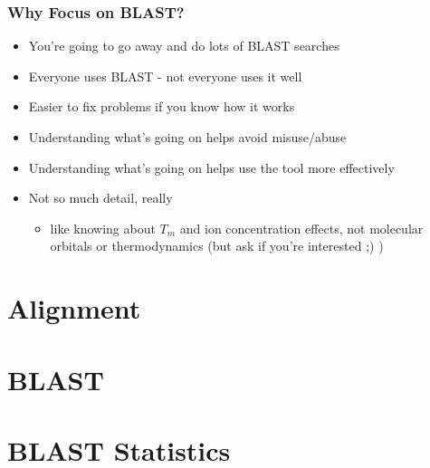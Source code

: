 \begin{frame}
  \frametitle{Why Focus on BLAST?}
  \begin{itemize}
    \item You're going to go away and do lots of BLAST searches
    \item Everyone uses BLAST - not everyone uses it well
    \item Easier to fix problems if you know how it works
    \item Understanding what's going on helps avoid misuse/abuse
    \item Understanding what's going on helps use the tool more effectively
    \item Not so much detail, really
    \begin{itemize}
      \item like knowing about $T_m$ and ion concentration effects, not molecular 
               orbitals or thermodynamics (but ask if you're interested ;) )
    \end{itemize}
  \end{itemize}
\end{frame}      

  
\section{Alignment} 
  
  
  

\section{BLAST}
  

\section{BLAST Statistics}
   
  
  
